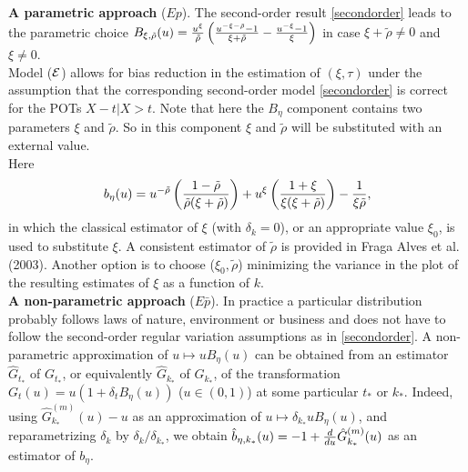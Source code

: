 \documentclass[twoside,leqno,11pt]{article}
\begin{document}
\vspace{0.3cm} \noindent
  {\bf A parametric approach} ($Ep$).  The second-order result \eqref{secondorder} leads to the parametric choice $B_{\xi,\tilde{\rho}}(u)= {u^{\xi} \over \tilde\rho}\left({u^{-\xi -\tilde{\rho}}-1 \over \xi +\tilde\rho}- {u^{-\xi}-1 \over \xi}\right)$ in case  $\xi+\tilde\rho \neq 0$ and $\xi \neq 0$. \\
  Model (${\cal{E}}$)  allows for bias reduction in the estimation of  $(\xi,\tau)$ under the assumption that the corresponding second-order model \eqref{secondorder} is correct for the POTs  $X-t|X>t$. Note that here the $B_{\eta}$ component contains two parameters $\xi$ and $\tilde\rho$. So in this component $\xi$ and $\tilde\rho$ will be substituted with an external value.
\\
  Here
\[b_\eta (u)= u^{-\tilde\rho}\left( {1-\tilde\rho\over \tilde\rho (\xi +\tilde\rho)}\right)
+ u^\xi \left( {1+\xi \over \xi (\xi +\tilde\rho)}\right)
- {1 \over \xi\tilde\rho},
\]
in which the classical estimator of $\xi$ (with $\delta_k=0$), or an appropriate value $\xi_0$, is used to substitute $\xi$. A consistent estimator of $\tilde\rho$ is provided in Fraga Alves et al. (2003). Another option is to choose  ($\xi_0,\tilde\rho$)  minimizing the variance in the plot of the resulting estimates of $\xi$ as a function of $k$.\\


 \noindent
{\bf A non-parametric approach} ($E{\bar{p}}$). 
In practice a particular distribution probably follows laws of nature, environment or business and does not have to follow the second-order regular variation assumptions as in  \eqref{secondorder}. A non-parametric approximation of $u\mapsto uB_\eta (u)$ can be obtained from an estimator $\hat{G}_{t_*}$ of $G_{t_*}$, or equivalently $\hat{G}_{k_*}$ of $G_{k_*}$, of the transformation $G_t(u)=u(1+\delta_t B_{\eta}(u))$ ($u \in (0,1)$) at some particular $t_*$ or $k_*$.
Indeed, using $\hat{G}_{k_*}^{(m)}(u) -u$ as an approximation of $u \mapsto \delta_{k_*} uB_\eta (u)$, and reparametrizing $\delta_k$ by $\delta_k/\delta_{k_*}$, we obtain $\hat{b}_{\eta,k_*} (u)=-1 + {d \over du}\hat{G}_{k_*}^{(m)}(u)$ as an estimator of $b_\eta$.\\
\end{document}

